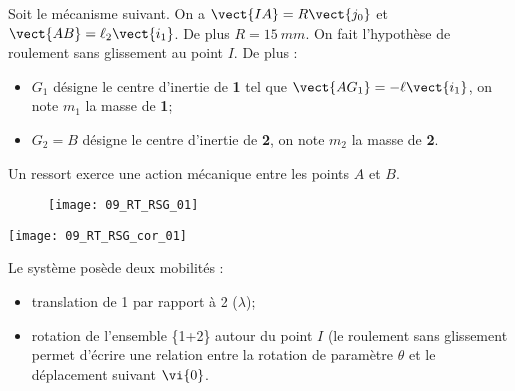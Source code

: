 \normalfalse \difficiletrue \tdifficilefalse
\correctiontrue

\setcounter{question}{0}%
\ifcorrection
\else
{}
\fi

\ifprof
\else
Soit le mécanisme suivant. On a $\vect{IA}=R\vect{j_0}$ et $\vect{AB}=\ell_2\vect{i_1}$. De plus $R=\SI{15}{mm}$.
On fait l'hypothèse de roulement sans glissement au point $I$. De plus :
\begin{itemize}
\item $G_1$ désigne le centre d'inertie de \textbf{1} tel que $\vect{AG_1}=-\ell\vect{i_1}$, on note $m_1$ la masse de \textbf{1};%
\item $G_2=B$ désigne le centre d'inertie de \textbf{2}, on note $m_2$ la masse de \textbf{2}.%
\end{itemize}
Un ressort exerce une action mécanique entre les points $A$ et $B$. 
\begin{figure}[!h]
\centering
\texttt{[image: 09\_RT\_RSG\_01]}
\end{figure}
\fi

\ifprof
\begin{marginfigure}
\texttt{[image: 09\_RT\_RSG\_cor\_01]}
\end{marginfigure}

\else
\fi

\ifprof

Le système posède deux mobilités : 
\begin{itemize}
\item translation de 1 par rapport à 2 ($\lambda$);
\item rotation de l'ensemble \{1+2\} autour du point $I$ (le roulement sans glissement permet d'écrire une relation entre la rotation de paramètre $\theta$ et le déplacement suivant $\vi{0}$.
\end{itemize}

